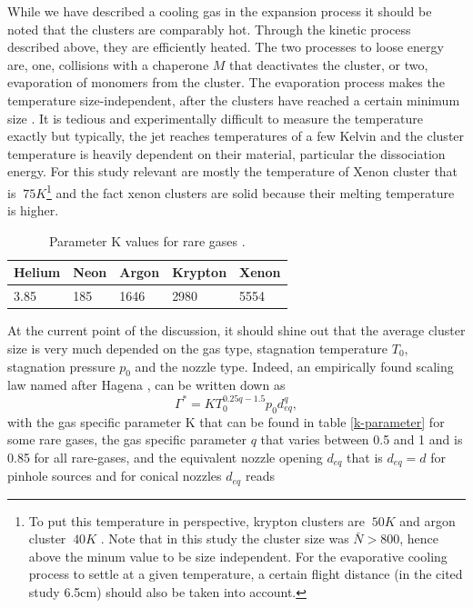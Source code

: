 While we have described a cooling gas in the expansion process it should be noted that the clusters are comparably hot. Through the kinetic process described above, they are efficiently heated. The two processes to loose energy are, one, collisions with a chaperone $M$ that deactivates the cluster, or two, evaporation of monomers from the cluster. The evaporation process makes the temperature size-independent, after the clusters have reached a certain minimum size \cite{Farges-1981-SurfSci}. It is tedious and experimentally difficult to measure the temperature exactly but typically, the jet reaches temperatures of a few Kelvin and the cluster temperature is heavily dependent on their material, particular the dissociation energy. For this study relevant are mostly the temperature of Xenon cluster that is $~75K$\footnote{To put this temperature in perspective, krypton clusters are $~50K$ and argon cluster $~40K$ \cite{Farges-1981-SurfSci,Gspann-1986-Springer}. Note that in this study the cluster size was $\bar{N} > 800$, hence above the minum value to be size independent. For the evaporative cooling process to settle at a given temperature, a certain flight distance (in the cited study 6.5cm) should also be taken into account.} and the fact xenon clusters are solid because their melting temperature is higher\cite{Gspann-1986-Springer}.\\
\begin{table}
	\centering
		\begin{tabular}{ | l | l | l | l | l | }
			\hline
			Helium & Neon & Argon & Krypton & Xenon \\ \hline
			3.85 & 185 & 1646 & 2980 & 5554 \\ \hline
		\end{tabular}
	\caption{Parameter K values for rare gases \cite{TBD}.}
	\label{tab:k-parameter}
\end{table}
At the current point of the discussion, it should shine out that the average cluster size is very much depended on the gas type, stagnation temperature $T_{0}$, stagnation pressure $p_{0}$ and the nozzle type. Indeed, an empirically found scaling law named after Hagena \cite{TBD}, can be written down as
\begin{equation}
\Gamma^{*} = K T_{0}^{0.25q-1.5} p_{0} d_{eq}^{q},
\label{eq:Hagena-parameter}
\end{equation}
with the gas specific parameter K that can be found in table \ref{k-parameter} for some rare gases, the gas specific parameter $q$ that varies between 0.5 and 1 and is 0.85 for all rare-gases, and the equivalent nozzle opening $d_{eq}$ that is $d_{eq}=d$ for pinhole sources and for conical nozzles $d_{eq}$ reads
